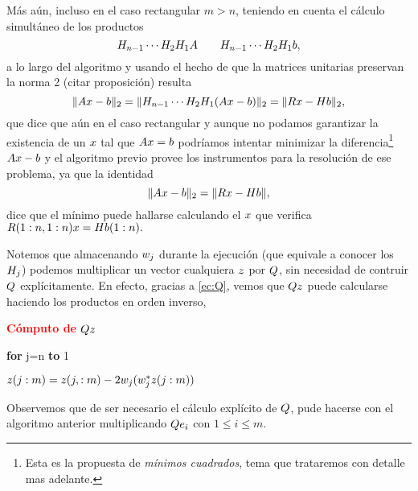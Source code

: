 \begin{tcolorbox}
Más aún, incluso en el caso rectangular $m>n$, teniendo en cuenta el cálculo simultáneo de los productos
$$
\Hbb_{n-1}\cdots \Hbb_2\Hbb_1\Ab \qquad \Hbb_{n-1}\cdots \Hbb_2\Hbb_1\bb,
$$
a lo largo del algoritmo y usando el hecho de que la matrices unitarias preservan la norma 2 (citar proposición) resulta
$$
\|\Ab\xb-\bb\|_2=\|\Hbb_{n-1}\cdots \Hbb_2\Hbb_1(\Ab\xb-\bb)\|_2=
\|
   \Rb\xb-\Hbb\bb
\|_2,
$$
que dice que aún en el caso rectangular y aunque no podamos garantizar la existencia de un $\xb$ tal que $\Ab\xb=\bb$ podríamos intentar minimizar la diferencia\footnote{Esta es la propuesta de  \emph{mínimos cuadrados}, tema que trataremos con detalle mas adelante.} $\Ab\xb-\bb$ y el algoritmo previo provee los instrumentos para la resolución de ese problema, ya que la identidad
$$
\|\Ab\xb-\bb\|_2=  \| \Rb\xb-\Hbb\bb\|,
$$
dice que el mínimo puede hallarse calculando el $\xb$ que verifica
$\Rb(1:n,1:n)\xb=\Hbb\bb(1:n).$

Notemos que almacenando $\wb_j$ durante la  ejecución (que equivale a conocer los $\Hb_j$) podemos multiplicar un vector cualquiera $\zb$ por $\Qb$, sin necesidad de contruir $\Qb$ explícitamente.
En efecto, gracias a \eqref{ec:Q}, vemos que $\Qb\zb$ puede calcularse haciendo los productos en orden inverso,

\begin{tcolorbox}[width=\linewidth*4/5]
\begin{center}
{\bf \textcolor{red}{Cómputo de $\Qb\zb$}}
\end{center}

{\bf for} j=n {\bf to} 1

\qquad \textcolor{red}{$\zb(j:m)=\zb(j,:m)-2\wb_j(\wb_j^*\zb(j:m))$}
\end{tcolorbox}
Observemos que de ser necesario el cálculo explícito de $\Qb$, pude hacerse con el algoritmo anterior multiplicando
$\Qb\eb_i$ con $1\le i\le  m$.

\end{tcolorbox}

